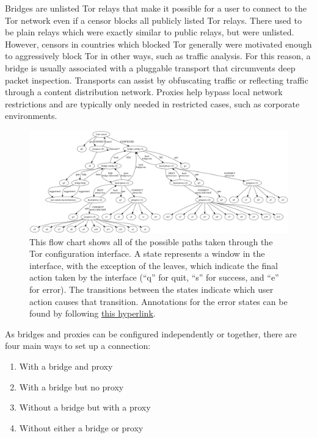 \documentclass{template}
\begin{document}
Bridges are unlisted Tor relays that make it possible for a user to connect
to the Tor network even if a censor blocks all publicly listed Tor relays. There used 
to be plain relays which were exactly similar to public relays, but were unlisted. However, 
censors in countries which blocked Tor generally were motivated enough to aggressively
block Tor in other ways, such as traffic analysis. For this reason, a bridge is usually associated
with a pluggable transport that circumvents deep packet inspection. Transports can
assist by obfuscating traffic or reflecting traffic through a content distribution network. 
Proxies help bypass local network restrictions and are typically only
needed in restricted cases, such as corporate environments.\\


\begin{figure}[t]
  \centering
    \includegraphics[width=\textwidth]{../torconfig.png}
    \caption{This flow chart shows all of the possible paths taken through the
    Tor configuration interface. A state represents a window in the interface,
    with the exception of the leaves, which indicate the final action taken by
    the interface (``q'' for quit, ``s'' for success, and ``e'' for error). The
    transitions between the states indicate which user action causes that
    transition. Annotations for the error states can be found by following
\href{https://github.com/lindanlee/circumvention-ux-tor/blob/master/torconfig.dot}{this hyperlink}.}
\label{fig:interface}
\end{figure}

As bridges and proxies can be configured independently or together, there are
four main ways to set up a connection:

\begin{enumerate} \itemsep1pt \parskip0pt 
    \item With a bridge and proxy
    \item With a bridge but no proxy
    \item Without a bridge but with a proxy
    \item Without either a bridge or proxy
\end{enumerate}
\end{document}
